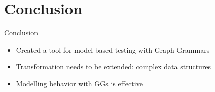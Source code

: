 \documentclass{FMTslides}
\begin{document}
\section[Conclusion]{Conclusion}

\begin{frame}{Conclusion}
  \begin{itemize}[<+->]
    \item Created a tool for model-based testing with Graph Grammars
    \item Transformation needs to be extended: complex data structures
    \item Modelling behavior with GGs is effective
  \end{itemize}
\end{frame}
\end{document}
